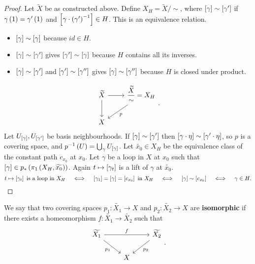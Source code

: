 \begin{proof}
Let $ \widetilde{X} $ be as constructed above. Define $ X_H = \widetilde{X} / \sim $, where $ \sb{\gamma} \sim \sb{\gamma'} $ if $ \gamma\rb{1} = \gamma'\rb{1} $ and $ \sb{\gamma \cdot \rb{\gamma'}^{-1}} \in H $. This is an equivalence relation.
\begin{itemize}
\item $ \sb{\gamma} \sim \sb{\gamma} $ because $ id \in H $.
\item $ \sb{\gamma} \sim \sb{\gamma'} $ gives $ \sb{\gamma'} \sim \sb{\gamma} $ because $ H $ contains all its inverses.
\item $ \sb{\gamma} \sim \sb{\gamma'} $ and $ \sb{\gamma'} \sim \sb{\gamma''} $ gives $ \sb{\gamma} \sim \sb{\gamma''} $ because $ H $ is closed under product.
\end{itemize}
$$
\begin{tikzcd}
\widetilde{X} \arrow{r} \arrow{d} & \dfrac{\widetilde{X}}{\sim} = X_H \arrow{dl}{p} \\
X &
\end{tikzcd}.
$$
Let $ U_{\sb{\gamma}}, U_{\sb{\gamma'}} $ be basis neighbourhoods. If $ \sb{\gamma} \sim \sb{\gamma'} $ then $ \sb{\gamma \cdot \eta} \sim \sb{\gamma' \cdot \eta} $, so $ p $ is a covering space, and $ p^{-1}\rb{U} = \bigcup_\gamma U_{\sb{\gamma}} $. Let $ \widetilde{x_0} \in X_H $ be the equivalence class of the constant path $ c_{x_0} $ at $ x_0 $. Let $ \gamma $ be a loop in $ X $ at $ x_0 $ such that $ \sb{\gamma} \in p_*\rb{\pi_1\rb{X_H, \widetilde{x_0}}} $. Again $ t \mapsto \sb{\gamma_t} $ is a lift of $ \gamma $ at $ \widetilde{x_0} $.
$$ t \mapsto \sb{\gamma_t} \ \text{is a loop in} \ X_H \quad \iff \quad \sb{\gamma_1} = \sb{\gamma} = \sb{c_{x_0}} \ \text{in} \ X_H \quad \iff \quad \sb{\gamma} \sim \sb{c_{x_0}} \quad \iff \quad \gamma \in H. $$
\end{proof}

\pagebreak

\begin{definition*}
We say that two covering spaces $ p_1 : \widetilde{X_1} \to X $ and $ p_2 : \widetilde{X_2} \to X $ are \textbf{isomorphic} if there exists a homeomorphism $ f : \widetilde{X_1} \to \widetilde{X_2} $ such that
$$
\begin{tikzcd}
\widetilde{X_1} \arrow{rr}{f} \arrow[swap]{dr}{p_1} & & \widetilde{X_2} \arrow{dl}{p_2} \\
& X &
\end{tikzcd}.
$$
\end{definition*}

